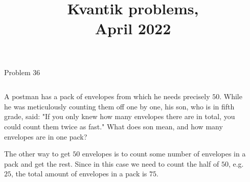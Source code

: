 \documentclass[9pt,aspectratio=169]{beamer}
\title{Kvantik problems,\\ April 2022}
\begin{document}
\maketitle

\begin{frame}{Problem 36}
  \begin{columns}[T]
    \begin{column}{0.5\textwidth}
      \begin{problem}
        A postman has a pack of envelopes from which he needs precisely $50$. While he was meticulously counting them off one by one, his son, who is in fifth grade, said: "If you only knew how many envelopes there are in total, you could count them twice as fast." What does son mean, and how many envelopes are in one pack?
      \end{problem}

      The other way to get $50$ envelopes is to count some number of envelopes in a pack and get the rest. Since in this case we need to count the half of $50$, e.g. $25$, the total amount of envelopes in a pack is $75$.
    \end{column}
    \begin{column}{0.5\textwidth}
    \end{column}
  \end{columns}
\end{frame}
\end{document}
